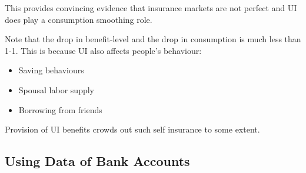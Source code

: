         This provides convincing evidence that insurance markets are not perfect and UI does play a consumption smoothing role.
        
        Note that the drop in benefit-level and the drop in consumption is much less than 1-1. This is because UI also affects people's  behaviour:
        \begin{itemize}
            \item Saving behaviours
            \item Spousal labor supply
            \item Borrowing from friends
        \end{itemize}
        Provision of UI benefits crowds out such self insurance to some extent.
    
    \subsection{Using Data of Bank Accounts}
    
